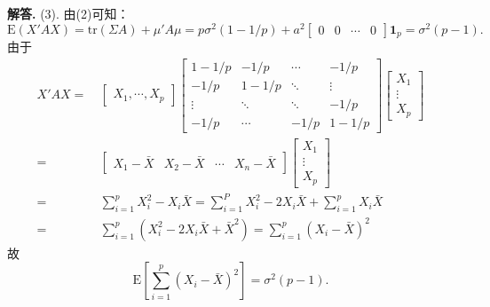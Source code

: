 \documentclass[12pt, a4paper, oneside]{ctexart}
\newenvironment{solution}[1][]{\par\noindent\textbf{#1解答. }}{\smallskip\par}  %
\def\bd{\boldsymbol}        %
\def\E{\textrm{E}}          %
\def\1{\bd{1}}
\begin{document}
\begin{solution}
    (3). 由(2)可知：$\E(X'AX) = \text{tr}(\Sigma A) + \mu'A\mu = p\sigma^2(1-1/p) + a^2\begin{bmatrix}
        0&0&\cdots&0
    \end{bmatrix}\1_p = \sigma^2(p-1).$
    由于
    \begin{align*}
        X'AX =&\ \begin{bmatrix}
            X_1,\cdots,X_p
        \end{bmatrix}\begin{bmatrix}
            1-1/p&-1/p&\cdots&-1/p\\
            -1/p&1-1/p&\ddots&\vdots\\
            \vdots&\ddots&\ddots&-1/p\\
            -1/p&\cdots&-1/p&1-1/p
        \end{bmatrix}\begin{bmatrix}
            X_1\\\vdots\\X_p
        \end{bmatrix}\\
        =&\ \begin{bmatrix}
            X_1-\bar{X}&X_2-\bar{X}&\cdots&X_n-\bar{X}
        \end{bmatrix}\begin{bmatrix}
            X_1\\\vdots\\X_p
        \end{bmatrix}\\
        =&\ \sum_{i=1}^pX_i^2 - X_i\bar{X} = \sum_{i=1}^PX_i^2-2X_i\bar{X} + \sum_{i=1}^pX_i\bar{X}\\
        =&\ \sum_{i=1}^p(X_i^2-2X_i\bar{X}+\bar{X}^2) = \sum_{i=1}^p(X_i-\bar{X})^2
    \end{align*}
    故
    \begin{equation*}
        \E\left[\sum_{i=1}^p(X_i-\bar{X})^2\right] = \sigma^2(p-1).
    \end{equation*}
\end{solution}
\end{document}
